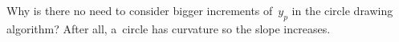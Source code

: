 Why is there no need to consider bigger increments of~$y_p$ in the
circle drawing algorithm? After all, a~circle has curvature so the
slope increases.
